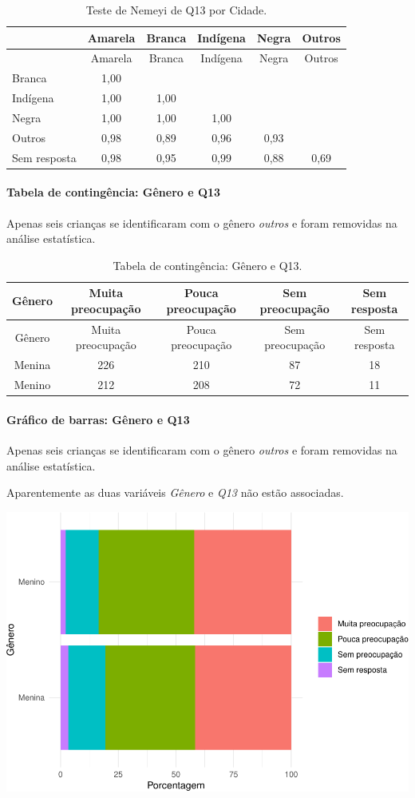 \documentclass[]{article}
\let\oldparagraph\paragraph
\renewcommand{\paragraph}[1]{\oldparagraph{#1}\mbox{}}
\begin{document}
\begin{longtable}[]{@{}lccccc@{}}
\caption{\label{tab:unnamed-chunk-61}Teste de Nemeyi de Q13 por Cidade.}\tabularnewline
\toprule
& Amarela & Branca & Indígena & Negra & Outros\tabularnewline
\midrule
\endfirsthead
\toprule
& Amarela & Branca & Indígena & Negra & Outros\tabularnewline
\midrule
\endhead
Branca & 1,00 & & & &\tabularnewline
Indígena & 1,00 & 1,00 & & &\tabularnewline
Negra & 1,00 & 1,00 & 1,00 & &\tabularnewline
Outros & 0,98 & 0,89 & 0,96 & 0,93 &\tabularnewline
Sem resposta & 0,98 & 0,95 & 0,99 & 0,88 & 0,69\tabularnewline
\bottomrule
\end{longtable}

\cleardoublepage

\hypertarget{tabela-de-continguxeancia-guxeanero-e-q13}{%
\paragraph{Tabela de contingência: Gênero e Q13}\label{tabela-de-continguxeancia-guxeanero-e-q13}}

Apenas seis crianças se identificaram com o gênero \emph{outros} e foram removidas na análise estatística.

\begin{longtable}[]{@{}ccccc@{}}
\caption{\label{tab:unnamed-chunk-62}Tabela de contingência: Gênero e Q13.}\tabularnewline
\toprule
Gênero & Muita preocupação & Pouca preocupação & Sem preocupação & Sem resposta\tabularnewline
\midrule
\endfirsthead
\toprule
Gênero & Muita preocupação & Pouca preocupação & Sem preocupação & Sem resposta\tabularnewline
\midrule
\endhead
Menina & 226 & 210 & 87 & 18\tabularnewline
Menino & 212 & 208 & 72 & 11\tabularnewline
\bottomrule
\end{longtable}

\hypertarget{gruxe1fico-de-barras-guxeanero-e-q13}{%
\paragraph{Gráfico de barras: Gênero e Q13}\label{gruxe1fico-de-barras-guxeanero-e-q13}}

Apenas seis crianças se identificaram com o gênero \emph{outros} e foram removidas na análise estatística.

Aparentemente as duas variáveis \emph{Gênero} e \emph{Q13} não estão associadas.

\begin{center}\includegraphics[width=0.75\linewidth]{relatorio_files/figure-latex/unnamed-chunk-63-1} \end{center}
\end{document}
